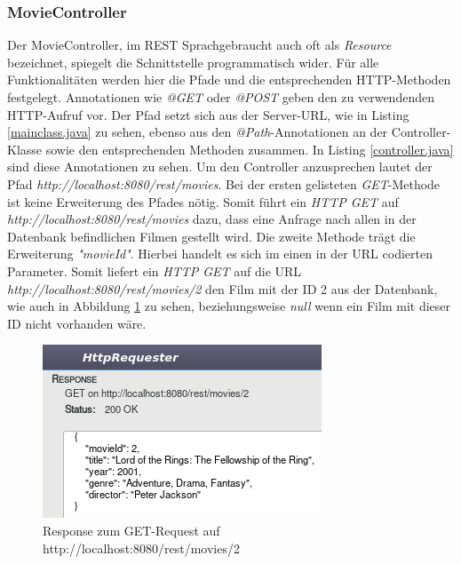\documentclass[fleqn,10.5pt,ngerman]{SelfArx}
\begin{document}
\subsubsection{MovieController}
Der MovieController, im REST Sprachgebraucht auch oft als \textit{Resource} bezeichnet, spiegelt die Schnittstelle programmatisch wider. Für alle Funktionalitäten werden hier die Pfade und die entsprechenden HTTP-Methoden festgelegt. Annotationen wie \textit{@GET} oder \textit{@POST} geben den zu verwendenden HTTP-Aufruf vor. Der Pfad setzt sich aus der Server-URL, wie in Listing \ref{mainclass.java} zu sehen, ebenso aus den \textit{@Path}-Annotationen an der Controller-Klasse sowie den entsprechenden Methoden zusammen. In Listing \ref{controller.java} sind diese Annotationen zu sehen. Um den Controller anzusprechen lautet der Pfad \textit{http://localhost:8080/rest/movies}. Bei der ersten gelisteten \textit{GET}-Methode ist keine Erweiterung des Pfades nötig. Somit führt ein \textit{HTTP GET} auf \textit{http://localhost:8080/rest/movies} dazu, dass eine Anfrage nach allen in der Datenbank befindlichen Filmen gestellt wird. Die zweite Methode trägt die Erweiterung \textit{"movieId"}. Hierbei handelt es sich im einen in der URL codierten Parameter.  Somit liefert ein \textit{HTTP GET} auf die URL \textit{http://localhost:8080/rest/movies/2} den Film mit der ID 2 aus der Datenbank, wie auch in Abbildung \ref{fig:responsebrowser} zu sehen, beziehungsweise \textit{null} wenn ein Film mit dieser ID nicht vorhanden wäre. 
\begin{figure}[ht]\centering
	\includegraphics[width=8.5 cm]{Abbildungen/getid2.jpg}
	\caption{Response zum GET-Request auf http://localhost:8080/rest/movies/2}
	\label{fig:responsebrowser}
\end{figure}

\end{document}
